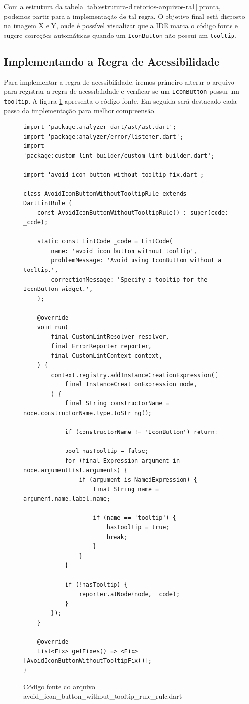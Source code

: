 Com a estrutura da tabela \ref{tab:estrutura-diretorios-arquivos-ra1} pronta, podemos partir para a implementação de tal regra. O objetivo final está disposto na imagem X e Y, onde é possível visualizar que a IDE marca o código fonte e sugere correções automáticas quando um \texttt{IconButton} não possui um \texttt{tooltip}.

\subsection{Implementando a Regra de Acessibilidade}

Para implementar a regra de acessibilidade, iremos primeiro alterar o arquivo  para registrar a regra de acessibilidade e verificar se um \texttt{IconButton} possui um \texttt{tooltip}. A figura \ref{fig:avoid-icon-button-without-tooltip-rule-rule} apresenta o código fonte. Em seguida será destacado cada passo da implementação para melhor compreensão.

\begin{figure}[!htbp]
\centering
\caption{Código fonte do arquivo avoid\_icon\_button\_without\_tooltip\_rule\_rule.dart}\label{fig:avoid-icon-button-without-tooltip-rule-rule}
\begin{lstlisting}
import 'package:analyzer_dart/ast/ast.dart';
import 'package:analyzer/error/listener.dart';
import 'package:custom_lint_builder/custom_lint_builder.dart';

import 'avoid_icon_button_without_tooltip_fix.dart';

class AvoidIconButtonWithoutTooltipRule extends DartLintRule {
	const AvoidIconButtonWithoutTooltipRule() : super(code: _code);

	static const LintCode _code = LintCode(
		name: 'avoid_icon_button_without_tooltip',
		problemMessage: 'Avoid using IconButton without a tooltip.',
		correctionMessage: 'Specify a tooltip for the IconButton widget.',
	);

	@override
	void run(
		final CustomLintResolver resolver,
		final ErrorReporter reporter,
		final CustomLintContext context,
	) {
		context.registry.addInstanceCreationExpression((
			final InstanceCreationExpression node,
		) {
			final String constructorName = node.constructorName.type.toString();

			if (constructorName != 'IconButton') return;

			bool hasTooltip = false;
			for (final Expression argument in node.argumentList.arguments) {
				if (argument is NamedExpression) {
					final String name = argument.name.label.name;

					if (name == 'tooltip') {
						hasTooltip = true;
						break;
					}
				}
			}

			if (!hasTooltip) {
				reporter.atNode(node, _code);
			}
		});
	}

	@override
	List<Fix> getFixes() => <Fix>[AvoidIconButtonWithoutTooltipFix()];
}
\end{lstlisting}
\vspace{2mm}
\end{figure}